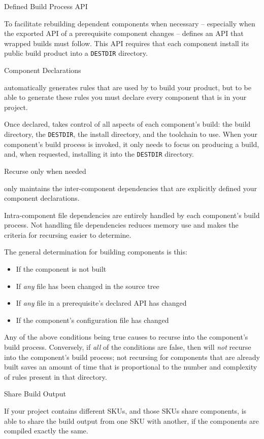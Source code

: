 \begin{description}
\item Defined Build Process API

  To facilitate rebuilding dependent components when necessary --
  especially when the exported API of a prerequisite component changes
  -- \lmsbw defines an API that wrapped builds must follow.  This API
  requires that each component install its public build product into a
  \texttt{DESTDIR} directory.

\item Component Declarations

  \lmsbw automatically generates rules that are used by \make to build
  your product, but to be able to generate these rules you must
  declare every component that is in your project.

  Once declared, \lmsbw takes control of all aspects of each
  component's build: the build directory, the \texttt{DESTDIR}, the
  install directory, and the toolchain to use.  When your component's
  build process is invoked, it only needs to focus on producing a
  build, and, when requested, installing it into the \texttt{DESTDIR}
  directory.

\item Recurse only when needed

  \lmsbw only maintains the inter-component dependencies that are
  explicitly defined your component declarations.

  Intra-component file dependencies are entirely handled by each
  component's build process.  Not handling file dependencies reduces
  memory use and makes the criteria for recursing easier to determine.

  The general determination for building components is this:

  \begin{itemize}
  \item If the component is not built
  \item If \emph{any} file has been changed in the source tree
  \item If \emph{any} file in a prerequisite's declared API has
    changed
  \item If the component's configuration file has changed
  \end{itemize}

  Any of the above conditions being true causes \lmsbw to recurse into
  the component's build process.  Conversely, if \emph{all} of the
  conditions are false, then \lmsbw will \emph{not} recurse into the
  component's build process; not recursing for components that are
  already built saves an amount of time that is proportional to the
  number and complexity of \make rules present in that directory.

\item Share Build Output

  If your project contains different SKUs, and those SKUs share
  components, \lmsbw is able to share the build output from one SKU
  with another, if the components are compiled exactly the same.

\end{description}

